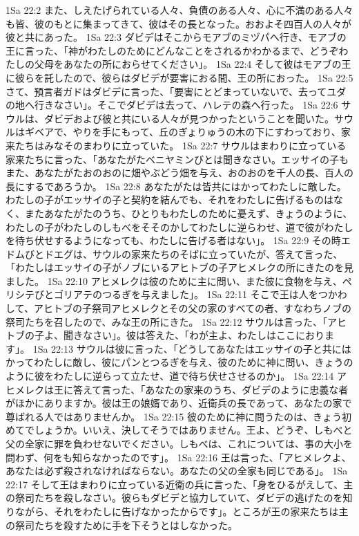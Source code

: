 1Sa 22:2  また、しえたげられている人々、負債のある人々、心に不満のある人々も皆、彼のもとに集まってきて、彼はその長となった。おおよそ四百人の人々が彼と共にあった。
1Sa 22:3  ダビデはそこからモアブのミヅパへ行き、モアブの王に言った、「神がわたしのためにどんなことをされるかわかるまで、どうぞわたしの父母をあなたの所におらせてください」。
1Sa 22:4  そして彼はモアブの王に彼らを託したので、彼らはダビデが要害におる間、王の所におった。
1Sa 22:5  さて、預言者ガドはダビデに言った、「要害にとどまっていないで、去ってユダの地へ行きなさい」。そこでダビデは去って、ハレテの森へ行った。
1Sa 22:6  サウルは、ダビデおよび彼と共にいる人々が見つかったということを聞いた。サウルはギベアで、やりを手にもって、丘のぎょりゅうの木の下にすわっており、家来たちはみなそのまわりに立っていた。
1Sa 22:7  サウルはまわりに立っている家来たちに言った、「あなたがたベニヤミンびとは聞きなさい。エッサイの子もまた、あなたがたおのおのに畑やぶどう畑を与え、おのおのを千人の長、百人の長にするであろうか。
1Sa 22:8  あなたがたは皆共にはかってわたしに敵した。わたしの子がエッサイの子と契約を結んでも、それをわたしに告げるものはなく、またあなたがたのうち、ひとりもわたしのために憂えず、きょうのように、わたしの子がわたしのしもべをそそのかしてわたしに逆らわせ、道で彼がわたしを待ち伏せするようになっても、わたしに告げる者はない」。
1Sa 22:9  その時エドムびとドエグは、サウルの家来たちのそばに立っていたが、答えて言った、「わたしはエッサイの子がノブにいるアヒトブの子アヒメレクの所にきたのを見ました。
1Sa 22:10  アヒメレクは彼のために主に問い、また彼に食物を与え、ペリシテびとゴリアテのつるぎを与えました」。
1Sa 22:11  そこで王は人をつかわして、アヒトブの子祭司アヒメレクとその父の家のすべての者、すなわちノブの祭司たちを召したので、みな王の所にきた。
1Sa 22:12  サウルは言った、「アヒトブの子よ、聞きなさい」。彼は答えた、「わが主よ、わたしはここにおります」。
1Sa 22:13  サウルは彼に言った、「どうしてあなたはエッサイの子と共にはかってわたしに敵し、彼にパンとつるぎを与え、彼のために神に問い、きょうのように彼をわたしに逆らって立たせ、道で待ち伏せさせるのか」。
1Sa 22:14  アヒメレクは王に答えて言った、「あなたの家来のうち、ダビデのように忠義な者がほかにありますか。彼は王の娘婿であり、近衛兵の長であって、あなたの家で尊ばれる人ではありませんか。
1Sa 22:15  彼のために神に問うたのは、きょう初めてでしょうか。いいえ、決してそうではありません。王よ、どうぞ、しもべと父の全家に罪を負わせないでください。しもべは、これについては、事の大小を問わず、何をも知らなかったのです」。
1Sa 22:16  王は言った、「アヒメレクよ、あなたは必ず殺されなければならない。あなたの父の全家も同じである」。
1Sa 22:17  そして王はまわりに立っている近衛の兵に言った、「身をひるがえして、主の祭司たちを殺しなさい。彼らもダビデと協力していて、ダビデの逃げたのを知りながら、それをわたしに告げなかったからです」。ところが王の家来たちは主の祭司たちを殺すために手を下そうとはしなかった。

